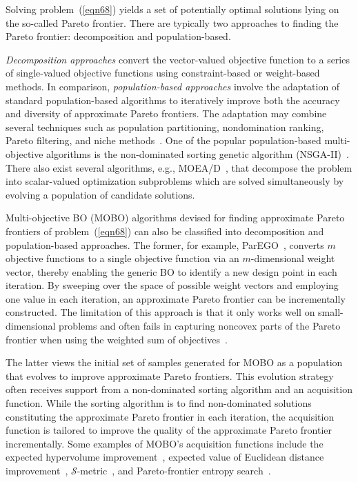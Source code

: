 \documentclass[iicol,sn-basic]{sn-jnl}%
\begin{document}
Solving problem~(\ref{eqn68}) yields a set of potentially optimal solutions lying on the so-called Pareto frontier.
There are typically two approaches to finding the Pareto frontier: decomposition and population-based.

\textit{Decomposition approaches} convert the vector-valued objective function to a series of single-valued objective functions using constraint-based or weight-based methods.
In comparison, \textit{population-based approaches} involve the adaptation of standard population-based algorithms to iteratively improve both the accuracy and diversity of approximate Pareto frontiers. The adaptation may combine several techniques such as population partitioning, nondomination ranking, Pareto filtering, and niche methods~\citep{Kochenderfer2019}. 
One of the popular population-based multi-objective algorithms is the non-dominated sorting genetic algorithm (NSGA-II)~\citep{Deb2002}.
There also exist several algorithms, e.g., MOEA/D~\citep{ZhangQ2007}, that decompose the problem into scalar-valued optimization subproblems which are solved simultaneously by evolving a population of candidate solutions. 

Multi-objective BO (MOBO) algorithms devised for finding approximate Pareto frontiers of problem~(\ref{eqn68}) can also be classified into decomposition and population-based approaches.
The former, for example, ParEGO~\citep{Knowles2006}, converts $m$ objective functions to a single objective function via an $m$-dimensional weight vector, thereby enabling the generic BO to identify a new design point in each iteration.
By sweeping over the space of possible weight vectors and employing one value in each iteration, an approximate Pareto frontier can be incrementally constructed.
The limitation of this approach is that it only works well on small-dimensional problems and often fails in capturing noncovex parts of the Pareto frontier when using the weighted sum of objectives~\citep{Das1997}.

The latter views the initial set of samples generated for MOBO as a population that evolves to improve approximate Pareto frontiers.
This evolution strategy often receives support from a non-dominated sorting algorithm and an acquisition function.
While the sorting algorithm is to find non-dominated solutions constituting the approximate Pareto frontier in each iteration, the acquisition function is tailored to improve the quality of the approximate Pareto frontier incrementally.
Some examples of MOBO's acquisition functions include the expected hypervolume improvement~\citep{Emmerich2006}, expected value of Euclidean distance improvement~\citep{Keane2006}, $\mathcal{S}$-metric~\citep{Ponweiser2008}, and Pareto-frontier entropy search~\citep{Suzuki2020}.
\end{document}
